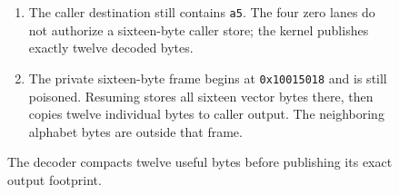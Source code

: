 \begin{figure}[htbp]
\begin{minipage}{\linewidth}
\begin{enumerate}
      \item The caller destination still contains \texttt{a5}. The four zero lanes do not authorize a sixteen-byte caller store; the kernel publishes exactly twelve decoded bytes.
      \item The private sixteen-byte frame begins at \texttt{0x10015018} and is still poisoned. Resuming stores all sixteen vector bytes there, then copies twelve individual bytes to caller output. The neighboring alphabet bytes are outside that frame.
    \end{enumerate}
  \end{minipage}
  \caption{The decoder compacts twelve useful bytes before publishing its exact output footprint.}
  \label{capture:028-base64-f04}
  \label{base64-f04}
\end{figure}
\par

